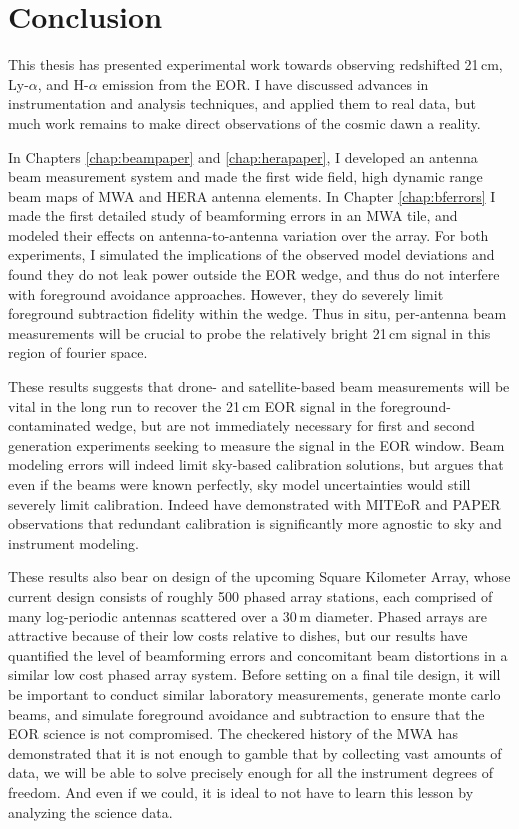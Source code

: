 \chapter{Conclusion}

This thesis has presented experimental work towards observing redshifted 21\,cm, Ly-$\alpha$, and H-$\alpha$ emission from the EOR. I have discussed advances in instrumentation and analysis techniques, and applied them to real data, but much work remains to make direct observations of the cosmic dawn a reality. 
 
In Chapters \ref{chap:beampaper} and \ref{chap:herapaper}, I developed an antenna beam measurement system and made the first wide field, high dynamic range beam maps of MWA and HERA antenna elements. In Chapter \ref{chap:bferrors} I made the first detailed study of beamforming errors in an MWA tile, and modeled their effects on antenna-to-antenna variation over the array. For both experiments, I simulated the implications of the observed model deviations and found they do not leak power outside the EOR wedge, and thus do not interfere with foreground avoidance approaches. However, they do severely limit foreground subtraction fidelity within the wedge. Thus in situ, per-antenna beam measurements will be crucial to probe the relatively bright 21\,cm signal in this region of fourier space.

These results suggests that drone- and satellite-based beam measurements will be vital in the long run to recover the 21\,cm EOR signal in the foreground-contaminated wedge, but are not immediately necessary for first and second generation experiments seeking to measure the signal in the EOR window. Beam modeling errors will indeed limit sky-based calibration solutions, but \citet{ewallwice16b} argues that even if the beams were known perfectly, sky model uncertainties would still severely limit calibration. Indeed \citet{zheng14,ali15} have demonstrated with MITEoR and PAPER observations that redundant calibration is significantly more agnostic to sky and instrument modeling.

These results also bear on design of the upcoming Square Kilometer Array, whose current design consists of \citep{aavs,aavs2} roughly 500 phased array stations, each comprised of many log-periodic antennas scattered over a 30\,m diameter. Phased arrays are attractive because of their low costs relative to dishes, but our results have quantified the level of beamforming errors and concomitant beam distortions in a similar low cost phased array system. Before setting on a final tile design, it will be important to conduct similar laboratory measurements, generate monte carlo beams, and simulate foreground avoidance and subtraction to ensure that the EOR science is not compromised. The checkered history of the MWA has demonstrated that it is not enough to gamble that by collecting vast amounts of data, we will be able to solve precisely enough for all the instrument degrees of freedom. And even if we could, it is ideal to not have to learn this lesson by analyzing the science data.

